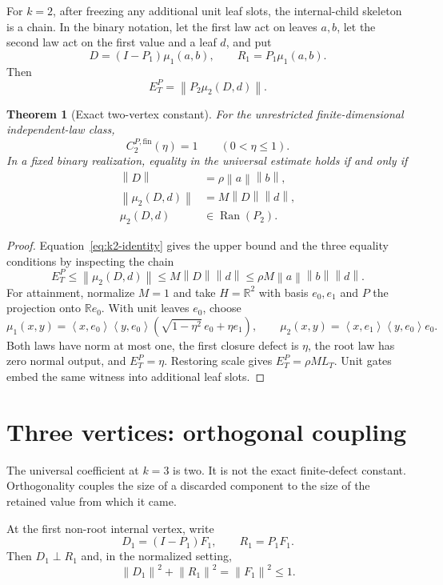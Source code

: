 \documentclass[11pt]{article}
\newtheorem{theorem}{Theorem}[section]
\theoremstyle{definition}
\newcommand{\R}{\mathbb{R}}
\newcommand{\Ran}{\operatorname{Ran}}
\newcommand{\fin}{\mathrm{fin}}
\newcommand{\norm}[1]{\left\lVert #1\right\rVert}
\newcommand{\ip}[2]{\left\langle #1,#2\right\rangle}
\begin{document}
For $k=2$, after freezing any additional unit leaf slots, the internal-child
skeleton is a chain.  In the binary notation, let the first law act on leaves
$a,b$, let the second law act on the first value and a leaf $d$, and put
\[
 D=(I-P_1)\mu_1(a,b),\qquad R_1=P_1\mu_1(a,b).
\]
Then
\begin{equation}\label{eq:k2-identity}
 E_T^P=\norm{P_2\mu_2(D,d)}.
\end{equation}

\begin{theorem}[Exact two-vertex constant]\label{thm:k2}
For the unrestricted finite-dimensional independent-law class,
\[
 \boxed{C_2^{P,\fin}(\eta)=1\qquad(0<\eta\le1).}
\]
In a fixed binary realization, equality in the universal estimate holds if and
only if
\begin{align*}
 \norm{D}&=\rho\norm a\norm b,\\
 \norm{\mu_2(D,d)}&=M\norm D\norm d,\\
 \mu_2(D,d)&\in\Ran(P_2).
\end{align*}
\end{theorem}
\begin{proof}
Equation~\eqref{eq:k2-identity} gives the upper bound and the three equality
conditions by inspecting the chain
\[
 E_T^P\le\norm{\mu_2(D,d)}
 \le M\norm D\norm d
 \le \rho M\norm a\norm b\norm d.
\]
For attainment, normalize $M=1$ and take $H=\R^2$ with basis $e_0,e_1$ and
$P$ the projection onto $\R e_0$.  With unit leaves $e_0$, choose
\[
 \mu_1(x,y)=\ip{x}{e_0}\ip{y}{e_0}
 (\sqrt{1-\eta^2}\,e_0+\eta e_1),
 \qquad
 \mu_2(x,y)=\ip{x}{e_1}\ip{y}{e_0}e_0.
\]
Both laws have norm at most one, the first closure defect is $\eta$, the root
law has zero normal output, and $E_T^P=\eta$.  Restoring scale gives
$E_T^P=\rho M L_T$.  Unit gates embed the same witness into additional leaf
slots.
\end{proof}

\section{Three vertices: orthogonal coupling}

The universal coefficient at $k=3$ is two.  It is not the exact finite-defect
constant.  Orthogonality couples the size of a discarded component to the size
of the retained value from which it came.

At the first non-root internal vertex, write
\[
 D_1=(I-P_1)F_1,\qquad R_1=P_1F_1.
\]
Then $D_1\perp R_1$ and, in the normalized setting,
\begin{equation}\label{eq:pythagorean}
 \norm{D_1}^2+\norm{R_1}^2=\norm{F_1}^2\le1.
\end{equation}
\end{document}
